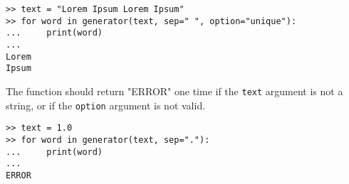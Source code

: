 \begin{verbatim}
>> text = "Lorem Ipsum Lorem Ipsum"
>> for word in generator(text, sep=" ", option="unique"):
...     print(word)
...
Lorem
Ipsum
\end{verbatim}

The function should return "ERROR" one time if the \texttt{text} argument is not a string, or if the \texttt{option} argument is not valid.

\begin{verbatim}
>> text = 1.0
>> for word in generator(text, sep="."):
...     print(word)
...
ERROR
\end{verbatim}